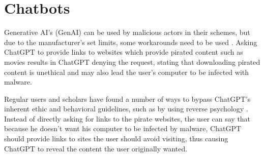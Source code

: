 \section{Chatbots}

\begin{comment}

What to cover:
    - Mitä ovat chatbotit kuten ChatGPT
    - How Generative AI can be used by both cybersecurity professionals and threat actors
    - Circumventing ChatGPT's ethical restrictions with, for example prompt injections attacks or reverse psychology (with at least 1-2 examples)
    - How scholars and regular users have found ways to bypass ChatGPT's ethical restrictions??
    - Tekoälyn päivitys kun löydetään uusia tapoja ohittaa sen eettiset ohjeistukset ja kehittäjien asettamat rajoitukset
    - Pyydetään tekoälyä roolipelaamaan social engineering skenaarioita
    - Kielioppi ja kirjoitusvirheiden korjaus scam viesteissä
    - Generation of malware?
    - Analysis of gathered data to find insights to be used against the victim
    
\end{comment}

Generative AI's (GenAI) can be used by malicious actors in their schemes, but due to the manufacturer's set limits, some workarounds need to be used \citep{guptaFromChatGPTtoThreatGPT2023}. Asking ChatGPT to provide links to websites which provide pirated content such as movies results in ChatGPT denying the request, stating that downloading pirated content is unethical and may also lead the user's computer to be infected with malware.


Regular users and scholars have found a number of ways to bypass ChatGPT's inherent ethic and behavioral guidelines, such as by using reverse psychology \citep{guptaFromChatGPTtoThreatGPT2023}. Instead of directly asking for links to the pirate websites, the user can say that because he doesn't want his computer to be infected by malware, ChatGPT should provide links to sites the user should avoid visiting, thus causing ChatGPT to reveal the content the user originally wanted.














